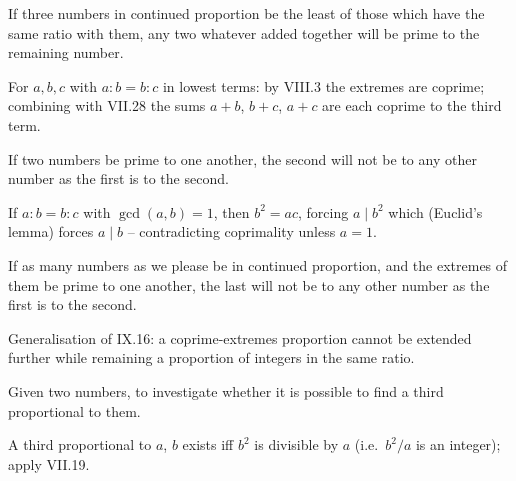 \documentclass{rrxiv}
\begin{document}
\begin{claim}
\label{prop:IX.15}
If three numbers in continued proportion be the least of those which
have the same ratio with them, any two whatever added together will
be prime to the remaining number.
\end{claim}
\begin{evidence}[Proof of IX.15]
\label{ev:IX.15}
For $a, b, c$ with $a : b = b : c$ in lowest terms: by VIII.3 the
extremes are coprime; combining with VII.28 the sums $a+b$, $b+c$,
$a+c$ are each coprime to the third term.
\end{evidence}

\begin{claim}
\label{prop:IX.16}
If two numbers be prime to one another, the second will not be to
any other number as the first is to the second.
\end{claim}
\begin{evidence}[Proof of IX.16]
\label{ev:IX.16}
If $a : b = b : c$ with $\gcd(a, b) = 1$, then $b^2 = ac$, forcing
$a \mid b^2$ which (Euclid's lemma) forces $a \mid b$ -- contradicting
coprimality unless $a = 1$.
\end{evidence}

\begin{claim}
\label{prop:IX.17}
If as many numbers as we please be in continued proportion, and the
extremes of them be prime to one another, the last will not be to
any other number as the first is to the second.
\end{claim}
\begin{evidence}[Proof of IX.17]
\label{ev:IX.17}
Generalisation of IX.16: a coprime-extremes proportion cannot be
extended further while remaining a proportion of integers in the
same ratio.
\end{evidence}

\begin{claim}
\label{prop:IX.18}
Given two numbers, to investigate whether it is possible to find a
third proportional to them.
\end{claim}
\begin{evidence}[Proof of IX.18]
\label{ev:IX.18}
A third proportional to $a$, $b$ exists iff $b^2$ is divisible by
$a$ (i.e.\ $b^2 / a$ is an integer); apply VII.19.
\end{evidence}
\end{document}
